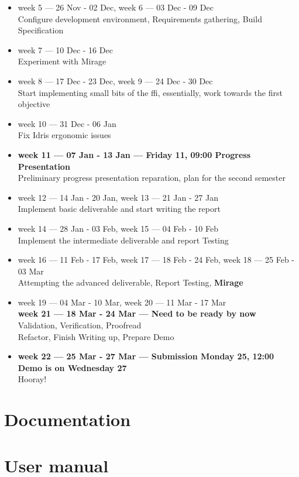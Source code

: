 \begin{itemize}
    \item week 5 --- 26 Nov - 02 Dec,
          week 6 --- 03 Dec - 09 Dec \\
          Configure development environment,
          Requirements gathering,
          Build Specification
    \item week 7 --- 10 Dec - 16 Dec \\
          Experiment with Mirage
    \item week 8 --- 17 Dec - 23 Dec,
          week 9 --- 24 Dec - 30 Dec \\
          Start implementing small bits
          of the ffi, essentially,
          work towards the first objective
    \item week 10 --- 31 Dec - 06 Jan \\ Fix Idris ergonomic issues
    \item \textbf{week 11 --- 07 Jan - 13 Jan ---
              Friday 11, 09:00
              Progress Presentation} \\ Preliminary progress presentation
          reparation, plan for the second semester
    \item week 12 --- 14 Jan - 20 Jan,
          week 13 --- 21 Jan - 27 Jan \\
          Implement basic deliverable
          and start writing
          the report
    \item week 14 --- 28 Jan - 03 Feb,
          week 15 --- 04 Feb - 10 Feb \\ Implement the intermediate
          deliverable and report Testing
    \item week 16 --- 11 Feb - 17 Feb,
          week 17 --- 18 Feb - 24 Feb,
          week 18 --- 25 Feb - 03 Mar \\ Attempting the advanced
          deliverable, Report Testing, \textbf{Mirage}
    \item week 19 --- 04 Mar - 10 Mar,
          week 20 --- 11 Mar - 17 Mar \\
          \textbf{week 21 --- 18 Mar - 24 Mar ---
              Need to be ready by now} \\
          Validation,
          Verification,
          Proofread \\
          Refactor,
          Finish Writing up,
          Prepare Demo
    \item \textbf{week 22 --- 25 Mar - 27 Mar ---
              Submission Monday 25, 12:00
              Demo is on Wednesday 27} \\ Hooray!

\end{itemize}

\section{Documentation}

\section{User manual}
